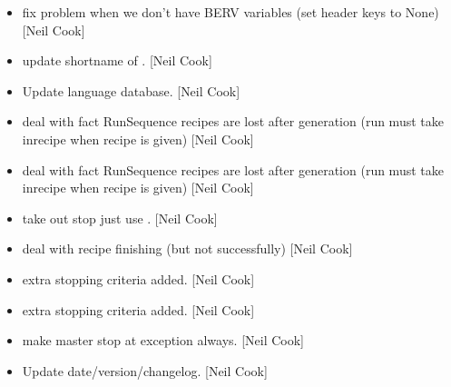 \documentclass[a4paper,10pt,english]{report}
\begin{document}
\begin{itemize}
\item {} 
 \sphinxhyphen{} fix problem when we don’t have BERV
variables (set header keys to None) {[}Neil Cook{]}

\item {} 
 \sphinxhyphen{} update shortname of
. {[}Neil Cook{]}

\item {} 
Update language database. {[}Neil Cook{]}

\item {} 
 \sphinxhyphen{} deal with fact RunSequence
recipes are lost after generation (run must take inrecipe when recipe
is given) {[}Neil Cook{]}

\item {} 
 \sphinxhyphen{} deal with fact RunSequence
recipes are lost after generation (run must take inrecipe when recipe
is given) {[}Neil Cook{]}

\item {} 
 \sphinxhyphen{} take out stop just use
. {[}Neil Cook{]}

\item {} 
 \sphinxhyphen{} deal with recipe finishing (but
not successfully) {[}Neil Cook{]}

\item {} 
 \sphinxhyphen{} extra stopping criteria added.
{[}Neil Cook{]}

\item {} 
 \sphinxhyphen{} extra stopping criteria added.
{[}Neil Cook{]}

\item {} 
 \sphinxhyphen{} make master stop at exception
always. {[}Neil Cook{]}

\item {} 
Update date/version/changelog. {[}Neil Cook{]}

\end{itemize}
\end{document}
